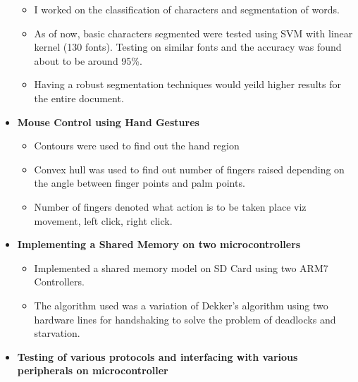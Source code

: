 \documentclass[10pt,a4paper,sans]{moderncv}        %
\begin{document}
\begin{itemize}
{\vspace{3pt}

		\small{
			\begin{itemize}
			\item I worked on the classification of characters and segmentation of words.
			\item As of now, basic characters %
				segmented were tested using SVM with linear kernel
				(130 fonts). Testing on similar fonts and the accuracy was found about to be around 95\%.
			\item Having a robust segmentation techniques would yeild higher results for the entire document.
			\end{itemize}
			}}	

		\vspace{3pt}

\item{\textbf{Mouse Control using Hand Gestures}

\vspace{3pt}

		\small{
			\begin{itemize}
					\item Contours were used to find out the hand region
					\item Convex hull was used to find out number of fingers raised depending on the angle between finger points and palm points.
					\item Number of fingers denoted what action is to be taken place viz movement, left click, right click.
			\end{itemize}
			}}
		\vspace{3pt}

	
\item{\textbf{Implementing a Shared Memory on two microcontrollers}

\vspace{3pt}

		\small{
			\begin{itemize}
					\item Implemented a shared memory model on SD Card using two ARM7 Controllers.
					\item The algorithm used was a variation of Dekker's algorithm using two hardware lines for handshaking to solve the problem of deadlocks and starvation.
			\end{itemize}
			}}

	\vspace{3pt}
	\item{\textbf{Testing of various protocols and interfacing with various peripherals on microcontroller}}

\end{itemize}
\end{document}
